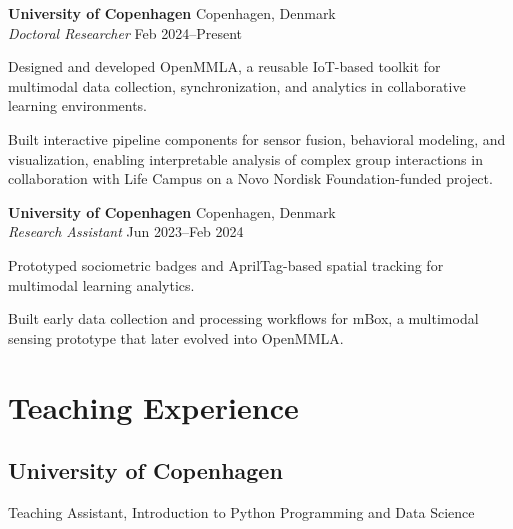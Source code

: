\documentclass[11pt,letterpaper]{report}
\newcommand{\listitemspace}{0.25em}
\renewenvironment{itemize}
{\begin{list}{}{\setlength{\leftmargin}{0em}
                \setlength{\parskip}{0em}
                \setlength{\itemsep}{\listitemspace}
                \setlength{\parsep}{\listitemspace}}}
{\end{list}}
\begin{document}
    \noindent \textbf{University of Copenhagen} \hfill Copenhagen, Denmark \\
    \textit{Doctoral Researcher} \hfill Feb 2024--Present
    \begin{list}{\textbullet}{\setlength{\leftmargin}{1.2em}
                   \setlength{\labelsep}{0.5em}
                   \setlength{\itemsep}{\listitemspace}
                   \setlength{\parsep}{\listitemspace}}
        \item Designed and developed OpenMMLA, a reusable IoT-based toolkit for multimodal data collection, synchronization, and analytics in collaborative learning environments.
        \item Built interactive pipeline components for sensor fusion, behavioral modeling, and visualization, enabling interpretable analysis of complex group interactions in collaboration with Life Campus on a Novo Nordisk Foundation-funded project.
    \end{list}
    \vspace{0.8em}

    \noindent \textbf{University of Copenhagen} \hfill Copenhagen, Denmark \\
    \textit{Research Assistant} \hfill Jun 2023--Feb 2024
    \begin{list}{\textbullet}{\setlength{\leftmargin}{1.2em}
                   \setlength{\labelsep}{0.5em}
                   \setlength{\itemsep}{\listitemspace}
                   \setlength{\parsep}{\listitemspace}}
        \item Prototyped sociometric badges and AprilTag-based spatial tracking for multimodal learning analytics.
        \item Built early data collection and processing workflows for mBox, a multimodal sensing prototype that later evolved into OpenMMLA.
    \end{list}

    \section*{Teaching Experience}

    \subsection*{University of Copenhagen}

    \begin{itemize}
        \item Teaching Assistant, Introduction to Python Programming and Data Science
    \end{itemize}
\end{document}
